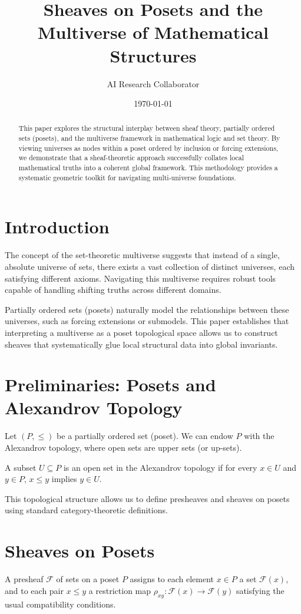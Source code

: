 \documentclass[11pt,oneside]{article}
\title{Sheaves on Posets and the Multiverse of Mathematical Structures}
\author{AI Research Collaborator}
\date{\today}
\begin{document}
\maketitle

\begin{abstract}
This paper explores the structural interplay between sheaf theory, partially ordered sets (posets), and the multiverse framework in mathematical logic and set theory. By viewing universes as nodes within a poset ordered by inclusion or forcing extensions, we demonstrate that a sheaf-theoretic approach successfully collates local mathematical truths into a coherent global framework. This methodology provides a systematic geometric toolkit for navigating multi-universe foundations.
\end{abstract}

\section{Introduction}
The concept of the set-theoretic multiverse suggests that instead of a single, absolute universe of sets, there exists a vast collection of distinct universes, each satisfying different axioms. Navigating this multiverse requires robust tools capable of handling shifting truths across different domains. 

Partially ordered sets (posets) naturally model the relationships between these universes, such as forcing extensions or submodels. This paper establishes that interpreting a multiverse as a poset topological space allows us to construct sheaves that systematically glue local structural data into global invariants.

\section{Preliminaries: Posets and Alexandrov Topology}
Let $(P, \le)$ be a partially ordered set (poset). We can endow $P$ with the Alexandrov topology, where open sets are upper sets (or up-sets).
\begin{definition}
A subset $U \subseteq P$ is an open set in the Alexandrov topology if for every $x \in U$ and $y \in P$, $x \le y$ implies $y \in U$.
\end{definition}

This topological structure allows us to define presheaves and sheaves on posets using standard category-theoretic definitions.

\section{Sheaves on Posets}
A presheaf $\mathcal{F}$ of sets on a poset $P$ assigns to each element $x \in P$ a set $\mathcal{F}(x)$, and to each pair $x \le y$ a restriction map $\rho_{xy}: \mathcal{F}(x) \to \mathcal{F}(y)$ satisfying the usual compatibility conditions.
\end{document}
